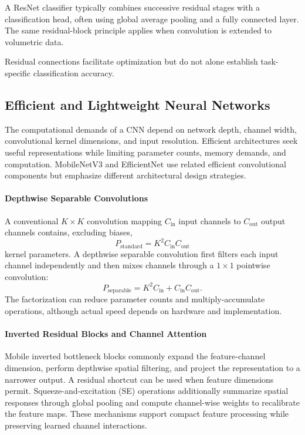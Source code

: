 A ResNet classifier typically combines successive residual stages with a classification head, often using global average pooling and a fully connected layer. The same residual-block principle applies when convolution is extended to volumetric data.

Residual connections facilitate optimization but do not alone establish task-specific classification accuracy.

\subsection{Efficient and Lightweight Neural Networks}

The computational demands of a CNN depend on network depth, channel width, convolutional kernel dimensions, and input resolution. Efficient architectures seek useful representations while limiting parameter counts, memory demands, and computation. MobileNetV3 \autocite{howard2019mobilenetv3} and EfficientNet \autocite{tan2019efficientnet} use related efficient convolutional components but emphasize different architectural design strategies.

\paragraph{Depthwise Separable Convolutions}
A conventional $K\times K$ convolution mapping $C_{\mathrm{in}}$ input channels to $C_{\mathrm{out}}$ output channels contains, excluding biases,
\begin{equation}
P_{\mathrm{standard}}=K^2C_{\mathrm{in}}C_{\mathrm{out}}
\end{equation}
kernel parameters. A depthwise separable convolution first filters each input channel independently and then mixes channels through a $1\times1$ pointwise convolution:
\begin{equation}
P_{\mathrm{separable}}=K^2C_{\mathrm{in}}+C_{\mathrm{in}}C_{\mathrm{out}}.
\end{equation}
The factorization can reduce parameter counts and multiply-accumulate operations, although actual speed depends on hardware and implementation.

\paragraph{Inverted Residual Blocks and Channel Attention}
Mobile inverted bottleneck blocks commonly expand the feature-channel dimension, perform depthwise spatial filtering, and project the representation to a narrower output. A residual shortcut can be used when feature dimensions permit. Squeeze-and-excitation (SE) operations additionally summarize spatial responses through global pooling and compute channel-wise weights to recalibrate the feature maps. These mechanisms support compact feature processing while preserving learned channel interactions.


